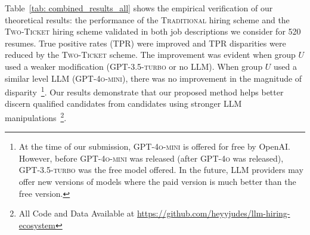 
    Table~\ref{tab: combined_results_all} shows the empirical verification of our theoretical results: the performance of the \textsc{Traditional} hiring scheme and the \textsc{Two-Ticket} hiring scheme validated in both job descriptions we consider for 520 resumes. True positive rates (TPR) were improved and TPR disparities were reduced by the \textsc{Two-Ticket} scheme. The improvement was evident when group $U$ used a weaker modification (\textsc{GPT-3.5-turbo} or no LLM). When group $U$ used a similar level LLM (\textsc{GPT-4o-mini}), there was no improvement in the magnitude of disparity~\footnote{At the time of our submission, \textsc{GPT-4o-mini} is offered for free by OpenAI. However, before \textsc{GPT-4o-mini} was released (after \textsc{GPT-4o} was released), \textsc{GPT-3.5-turbo} was the free model offered. In the future, LLM providers may offer new versions of models where the paid version is much better than the free version.}. Our results demonstrate that our proposed method helps better discern qualified candidates from candidates using stronger LLM manipulations~\footnote{All Code and Data Available at \url{https://github.com/heyyjudes/llm-hiring-ecosystem}}.
    

